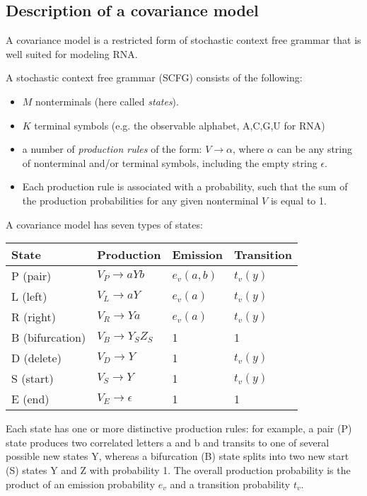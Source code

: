 \documentclass[11pt]{article}
\begin{document}
\subsection{Description of a covariance model}

A covariance model is a restricted form of stochastic context free
grammar that is well suited for modeling RNA.

A stochastic context free grammar (SCFG) consists of the following:

\begin{itemize}
\item $M$ nonterminals (here called \emph{states}).
\item $K$ terminal symbols (e.g. the observable alphabet, {A,C,G,U} for RNA)
\item a number of \emph{production rules} of the form:
      $V \rightarrow \alpha$,
      where $\alpha$ can be any string of nonterminal and/or terminal
      symbols, including the empty string
      $\epsilon$.
\item Each production rule is associated with a probability, such that
      the sum of the production probabilities for any given
      nonterminal $V$ is equal to 1.
\end{itemize} 

A covariance model has seven types of states:

\begin{tabular}{llll}
State              &  Production             & Emission & Transition\\ \hline
P (pair)           & $V_P \rightarrow a Y b$ & $e_v(a,b)$ & $t_v(y)$  \\
L (left)           & $V_L \rightarrow a Y$   & $e_v(a)$   & $t_v(y)$  \\
R (right)          & $V_R \rightarrow Y a$   & $e_v(a)$   & $t_v(y)$  \\
B (bifurcation)    & $V_B \rightarrow Y_S Z_S$  & 1     &     1     \\ \hline
D (delete)         & $V_D \rightarrow Y$     &    1     &   $t_v(y)$  \\
S (start)          & $V_S \rightarrow Y$     &    1     &   $t_v(y)$  \\
E (end)            & $V_E \rightarrow \epsilon$ & 1     &     1     \\
\end{tabular}

Each state has one or more distinctive production rules: for example,
a pair (P) state produces two correlated letters a and b and transits
to one of several possible new states Y, whereas a bifurcation (B)
state splits into two new start (S) states Y and Z with probability 1.
The overall production probability is the product of an emission
probability $e_v$ and a transition probability $t_v$. 
\end{document}
